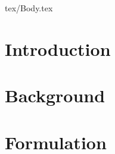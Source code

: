 \documentclass[11pt, twoside,draft]{article}
\begin{document}
\clearpage


\setcounter{tocdepth}{3}

\tableofcontents

\clearpage


%
\printnoidxglossaries

\clearpage

\listoftodos


\cleardoublepage




\ifdraft{

}
{
\begin{multicols}{2}

\end{multicols}
}
\begin{filecontents}{tex/Body.tex}


\section{Introduction}
\label{sec:introduction}


%

\section{Background}
\label{sec:background}


%

\section{Formulation}
\label{sec:formulation}


% 


%



\end{filecontents}

\end{document}

